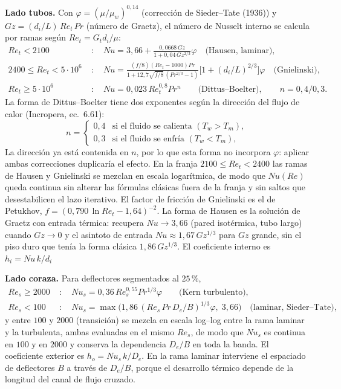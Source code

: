 \documentclass[11pt,a4paper]{article}
\begin{document}
\textbf{Lado tubos.} Con $\varphi = (\mu/\mu_w)^{0{,}14}$
(correcci\'on de Sieder--Tate (1936)\cite{sieder}) y $Gz = (d_i/L)\, Re_t\, Pr$
(n\'umero de Graetz), el n\'umero de Nusselt interno se calcula por ramas
seg\'un $Re_t = G_t d_i / \mu$:
\begin{align}
Re_t < 2100 \; &: \quad
Nu = 3{,}66 + \frac{0{,}0668\, Gz}{1 + 0{,}04\, Gz^{2/3}}\varphi
\quad \text{(Hausen, laminar)},\\[2pt]
2400 \le Re_t < 5\cdot 10^6 \; &: \quad
Nu = \frac{(f/8)(Re_t - 1000) Pr}{1 + 12{,}7\sqrt{f/8}\,(Pr^{2/3}-1)}
\Big[1 + (d_i/L)^{2/3}\Big] \varphi \quad \text{(Gnielinski)},\\[2pt]
Re_t \ge 5\cdot 10^6 \; &: \quad Nu = 0{,}023 \, Re_t^{0{,}8} Pr^{n}
\qquad \text{(Dittus--Boelter)}, \qquad n = 0{,}4/0{,}3.
\end{align}
La forma de Dittus--Boelter tiene dos exponentes seg\'un la direcci\'on del flujo de calor (Incropera, ec.~6.61):
\[
n = \begin{cases}
0{,}4 & \text{si el fluido se calienta } (T_w > T_m),\\[2pt]
0{,}3 & \text{si el fluido se enfr\'ia } (T_w < T_m),
\end{cases}
\]
La direcci\'on ya est\'a contenida en $n$, por lo que esta forma
no incorpora $\varphi$: aplicar ambas correcciones duplicar\'ia el efecto. En la franja $2100 \le Re_t < 2400$ las ramas de Hausen y Gnielinski se
mezclan en escala logar\'itmica, de modo que $Nu(Re)$ queda continua sin
alterar las f\'ormulas cl\'asicas fuera de la franja y sin saltos que
desestabilicen el lazo iterativo. El factor de fricci\'on de Gnielinski es el
de Petukhov, $f = (0{,}790\, \ln Re_t - 1{,}64)^{-2}$. La forma de Hausen es
la soluci\'on de Graetz con entrada t\'ermica: recupera $Nu \to 3{,}66$
(pared isot\'ermica, tubo largo) cuando $Gz \to 0$ y el asintoto de entrada
$Nu \approx 1{,}67\, Gz^{1/3}$ para $Gz$ grande, sin el piso duro que ten\'ia
la forma cl\'asica $1{,}86\,Gz^{1/3}$. El coeficiente interno es
$h_i = Nu \, k / d_i$

\textbf{Lado coraza.} Para deflectores segmentados al $25\,\%$,
\begin{align}
Re_s \ge 2000 \; &: \quad Nu_s = 0{,}36 \, Re_s^{0{,}55} Pr^{1/3} \varphi
\qquad \text{(Kern turbulento)},\\[2pt]
Re_s < 100 \; &: \quad Nu_s = \max\!\big(1{,}86 \, (Re_s\, Pr\, D_e/B)^{1/3}
\varphi,\; 3{,}66\big) \quad \text{(laminar, Sieder--Tate)},
\end{align}
y entre $100$ y $2000$ (transici\'on) se mezcla en escala log--log entre la
rama laminar y la turbulenta, ambas evaluadas en el mismo $Re_s$, de modo que
$Nu_s$ es continua en $100$ y en $2000$ y conserva la dependencia $D_e/B$ en
toda la banda. El coeficiente
exterior es $h_o = Nu_s \, k / D_e$. En la rama laminar interviene el espaciado
de deflectores $B$ a trav\'es de $D_e/B$, porque el desarrollo t\'ermico depende
de la longitud del canal de flujo cruzado.
\end{document}
